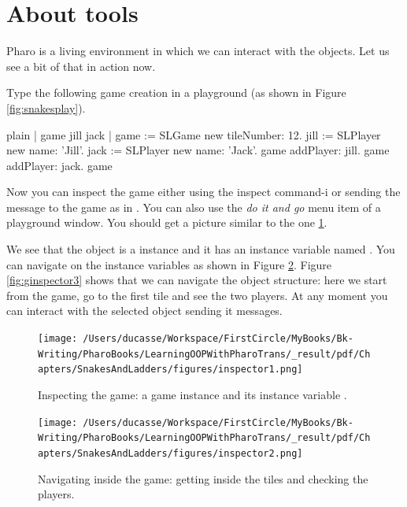 \documentclass[10pt,twoside,english]{_support/latex/sbabook/sbabook}
\begin{document}
\section{About tools}
Pharo is a living environment in which we can interact with the objects. Let us see a bit of that in action now.

Type the following game creation in a playground (as shown in Figure \ref{fig:snakesplay}).

\begin{displaycode}{plain}
| game jill jack |
game := SLGame new tileNumber: 12.
jill := SLPlayer new name: 'Jill'.
jack := SLPlayer new name: 'Jack'.
game addPlayer: jill.
game addPlayer: jack.
game 
\end{displaycode}

Now you can inspect the game either using the inspect command-i or sending the message  to the game as in . You can also use the \textit{do it and go} menu item of a playground window.  You should get a picture similar to the one \ref{fig:ginspector1}.

We see that the object is a  instance and it has an instance variable named . You can navigate on the instance variables as shown in Figure \ref{fig:ginspector2}. Figure \ref{fig:ginspector3} shows that we can navigate the object structure: here we start from the game, go to the first tile and see the two players. At any moment you can interact with the selected object sending it messages.


\begin{figure}

\begin{center}
\texttt{[image: /Users/ducasse/Workspace/FirstCircle/MyBooks/Bk-Writing/PharoBooks/LearningOOPWithPharoTrans/\_result/pdf/Chapters/SnakesAndLadders/figures/inspector1.png]}\caption{Inspecting the game: a game instance and its instance variable .\label{fig:ginspector1}}\end{center}
\end{figure}



\begin{figure}

\begin{center}
\texttt{[image: /Users/ducasse/Workspace/FirstCircle/MyBooks/Bk-Writing/PharoBooks/LearningOOPWithPharoTrans/\_result/pdf/Chapters/SnakesAndLadders/figures/inspector2.png]}\caption{Navigating inside the game: getting inside the tiles and checking the players.\label{fig:ginspector2}}\end{center}
\end{figure}
\end{document}
